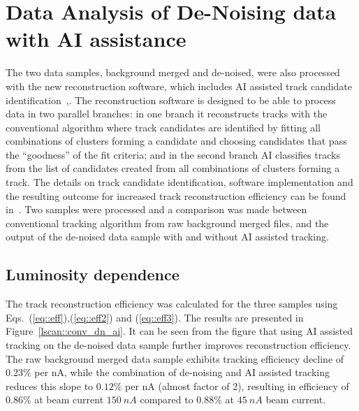 \section{Data Analysis of De-Noising data with AI assistance}

The two data samples, background merged and de-noised, were also processed with the new 
reconstruction software, which includes AI assisted track candidate identification~\cite{Gavalian:2020oxg},\cite{Gavalian:2020xmc}. 
The reconstruction software is designed to be able to process data in two parallel branches: in one 
branch it reconstructs tracks with the conventional algorithm where track candidates are identified by fitting all 
combinations of clusters forming a candidate and choosing candidates that pass the ``goodness'' of the fit criteria; 
 and in the second branch AI classifies tracks from the list of candidates created from all combinations of clusters 
 forming a track. 
 The details on track candidate identification, software implementation and the resulting outcome for increased 
 track reconstruction efficiency can be found in~\cite{Gavalian:2022hfa}.
 Two samples were processed and a comparison was made between conventional tracking algorithm from raw 
 background merged files, and the output of the de-noised data sample with and without AI assisted tracking. 

\subsection{Luminosity dependence}

The track reconstruction efficiency was calculated for the three samples using Eqs.~(\ref{eq::eff}),(\ref{eq::eff2}) and (\ref{eq::eff3}).
The results are presented in Figure~\ref{lscan::conv_dn_ai}. It can be seen from the figure that using 
AI assisted tracking on the de-noised data sample further improves reconstruction efficiency. The raw background 
merged data sample exhibits tracking efficiency decline of $0.23\%$ per nA, while the combination of de-noising 
and AI assisted tracking reduces this slope to $0.12\%$ per nA (almost factor of 2), resulting in efficiency of $0.86\%$ at
 beam current $150~nA$ compared to $0.88\%$ at $45~nA$ beam current. 

